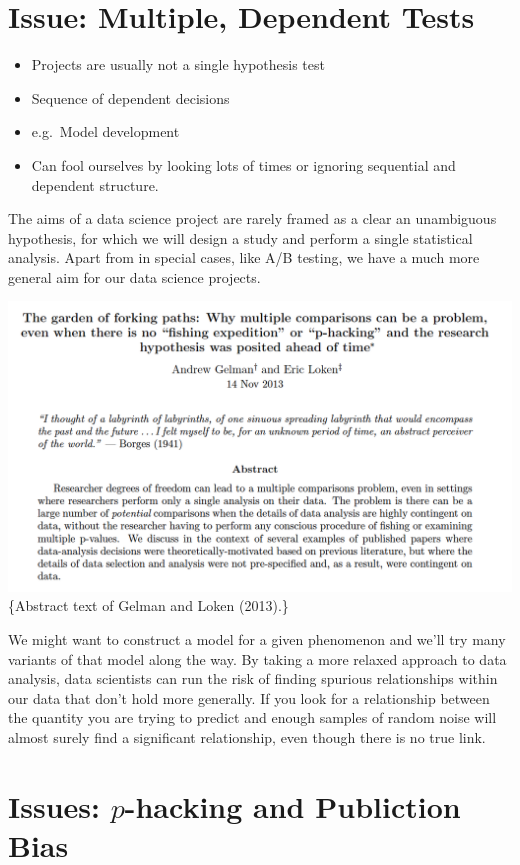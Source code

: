 \documentclass[
  letterpaper,
  DIV=11,
  numbers=noendperiod]{scrreprt}
\begin{document}
\section{Issue: Multiple, Dependent
Tests}\label{issue-multiple-dependent-tests}

\begin{itemize}
\item
  Projects are usually not a single hypothesis test
\item
  Sequence of dependent decisions
\item
  e.g.~Model development
\item
  Can fool ourselves by looking lots of times or ignoring sequential and
  dependent structure.
\end{itemize}

The aims of a data science project are rarely framed as a clear an
unambiguous hypothesis, for which we will design a study and perform a
single statistical analysis. Apart from in special cases, like A/B
testing, we have a much more general aim for our data science projects.

\includegraphics{images/401-production-reproducibility/forking-paths-abstract.png}\{Abstract
text of Gelman and Loken (2013).\}

We might want to construct a model for a given phenomenon and we'll try
many variants of that model along the way. By taking a more relaxed
approach to data analysis, data scientists can run the risk of finding
spurious relationships within our data that don't hold more generally.
If you look for a relationship between the quantity you are trying to
predict and enough samples of random noise will almost surely find a
significant relationship, even though there is no true link.

\section{\texorpdfstring{Issues: \(p\)-hacking and Publiction
Bias}{Issues: p-hacking and Publiction Bias}}\label{issues-p-hacking-and-publiction-bias}
\end{document}
